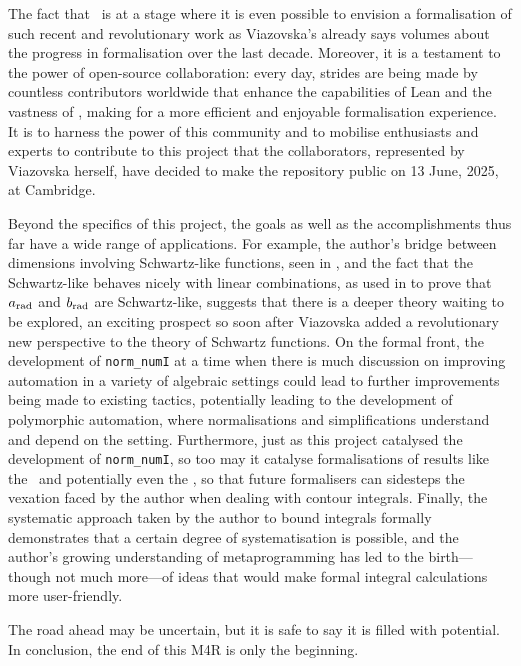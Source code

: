 
The fact that \mathlib\ is at a stage where it is even possible to envision a formalisation of such recent and revolutionary work as Viazovska's already says volumes about the progress in formalisation over the last decade. Moreover, it is a testament to the power of open-source collaboration: every day, strides are being made by countless contributors worldwide that enhance the capabilities of Lean and the vastness of \mathlib, making for a more efficient and enjoyable formalisation experience. It is to harness the power of this community and to mobilise enthusiasts and experts to contribute to this project that the collaborators, represented by Viazovska herself, have decided to make the repository public on 13 June, 2025, at Cambridge.

Beyond the specifics of this project, the goals as well as the accomplishments thus far have a wide range of applications. For example, the author's bridge between dimensions involving Schwartz-like functions, seen in , and the fact that the Schwartz-like behaves nicely with linear combinations, as used in  to prove that $a_{\operatorname{rad}}$ and $b_{\operatorname{rad}}$ are Schwartz-like, suggests that there is a deeper theory waiting to be explored, an exciting prospect so soon after Viazovska added a revolutionary new perspective to the theory of Schwartz functions. On the formal front, the development of \lstinline|norm_numI| at a time when there is much discussion on improving automation in a variety of algebraic settings could lead to further improvements being made to existing tactics, potentially leading to the development of polymorphic automation, where normalisations and simplifications understand and depend on the setting. Furthermore, just as this project catalysed the development of \lstinline|norm_numI|, so too may it catalyse formalisations of results like the \CGT\ and potentially even the \JCT, so that future formalisers can sidesteps the vexation faced by the author when dealing with contour integrals. Finally, the systematic approach taken by the author to bound integrals formally demonstrates that a certain degree of systematisation is possible, and the author's growing understanding of metaprogramming has led to the birth---though not much more---of ideas that would make formal integral calculations more user-friendly.

The road ahead may be uncertain, but it is safe to say it is filled with potential. In conclusion, the end of this M4R is only the beginning.